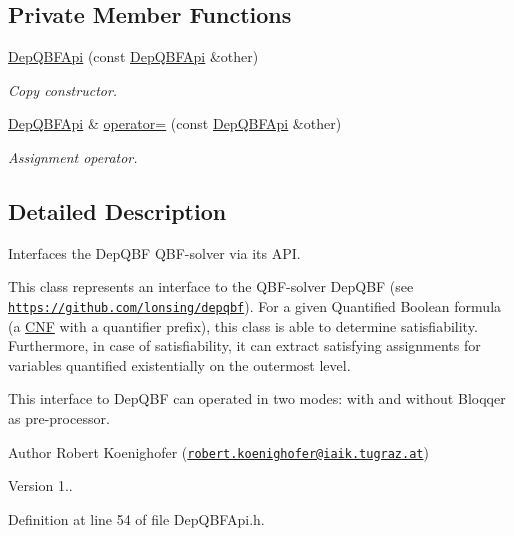 \subsection*{Private Member Functions}
\begin{DoxyCompactItemize}
\item 
\hyperlink{classDepQBFApi_ab7f7fe54d8ebfd6dc49296e10efada92}{Dep\-Q\-B\-F\-Api} (const \hyperlink{classDepQBFApi}{Dep\-Q\-B\-F\-Api} \&other)
\begin{DoxyCompactList}\small\item\em Copy constructor. \end{DoxyCompactList}\item 
\hyperlink{classDepQBFApi}{Dep\-Q\-B\-F\-Api} \& \hyperlink{classDepQBFApi_ac92d8d42313774de6ce7f3bb2ca121c0}{operator=} (const \hyperlink{classDepQBFApi}{Dep\-Q\-B\-F\-Api} \&other)
\begin{DoxyCompactList}\small\item\em Assignment operator. \end{DoxyCompactList}\end{DoxyCompactItemize}


\subsection{Detailed Description}
Interfaces the Dep\-Q\-B\-F Q\-B\-F-\/solver via its A\-P\-I. 

This class represents an interface to the Q\-B\-F-\/solver Dep\-Q\-B\-F (see \href{https://github.com/lonsing/depqbf}{\tt https\-://github.\-com/lonsing/depqbf}). For a given Quantified Boolean formula (a \hyperlink{classCNF}{C\-N\-F} with a quantifier prefix), this class is able to determine satisfiability. Furthermore, in case of satisfiability, it can extract satisfying assignments for variables quantified existentially on the outermost level.

This interface to Dep\-Q\-B\-F can operated in two modes\-: with and without Bloqqer as pre-\/processor.

\begin{DoxyAuthor}{Author}
Robert Koenighofer (\href{mailto:robert.koenighofer@iaik.tugraz.at}{\tt robert.\-koenighofer@iaik.\-tugraz.\-at}) 
\end{DoxyAuthor}
\begin{DoxyVersion}{Version}
1.. 
\end{DoxyVersion}


Definition at line 54 of file Dep\-Q\-B\-F\-Api.\-h.



